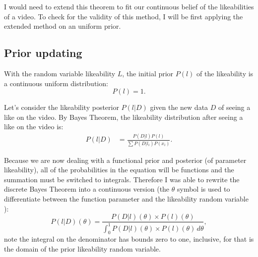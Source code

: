 \documentclass[a4paper,11pt]{article}
\begin{document}

I would need to extend this theorem to fit our continuous belief of the likeabilities of a video. To check for the validity of this method, I will be first applying the extended method on an uniform prior.

\subsection{Prior updating}
With the random variable likeability $L$, the initial prior $P(l)$ of the likeability is a continuous uniform distribution:
\[
    P(l) = 1.
\]

Let's consider the likeability posterior $P(l|D)$ given the new data $D$ of seeing a like on the video. By Bayes Theorem, the likeability distribution after seeing a like on the video is:
\begin{align*}
    P(l|D) &= \frac{P(D|l) P(l)}{\sum P(D|l_i) P(x_i) }.
\end{align*}

Because we are now dealing with a functional prior and posterior (of parameter likeability), all of the probabilities in the equation will be functions and the summation must be switched to integrals. Therefore I was able to rewrite the discrete Bayes Theorem into a continuous version (the $\theta$ symbol is used to differentiate between the function parameter and the likeability random variable ):
\[
    P(l|D)(\theta) = \frac{P(D|l)(\theta) \times P(l)(\theta)}{\int_{0}^{1} P(D|l)(\theta) \times P(l)(\theta) \, d\theta},
\]
note the integral on the denominator has bounds zero to one, inclusive, for that is the domain of the prior likeability random variable.
\end{document}
